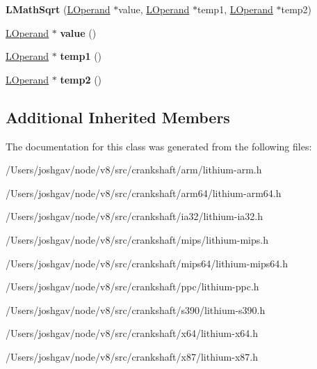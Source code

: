 \begin{DoxyCompactItemize}
\item 
{\bfseries L\+Math\+Sqrt} (\hyperlink{classv8_1_1internal_1_1_l_operand}{L\+Operand} $\ast$value, \hyperlink{classv8_1_1internal_1_1_l_operand}{L\+Operand} $\ast$temp1, \hyperlink{classv8_1_1internal_1_1_l_operand}{L\+Operand} $\ast$temp2)\hypertarget{classv8_1_1internal_1_1_l_math_sqrt_a0f3ccabf0c380c3c908a2fe569e251f5}{}\label{classv8_1_1internal_1_1_l_math_sqrt_a0f3ccabf0c380c3c908a2fe569e251f5}

\item 
\hyperlink{classv8_1_1internal_1_1_l_operand}{L\+Operand} $\ast$ {\bfseries value} ()\hypertarget{classv8_1_1internal_1_1_l_math_sqrt_a3a3d3a6f3e5469c0af488884adb214cd}{}\label{classv8_1_1internal_1_1_l_math_sqrt_a3a3d3a6f3e5469c0af488884adb214cd}

\item 
\hyperlink{classv8_1_1internal_1_1_l_operand}{L\+Operand} $\ast$ {\bfseries temp1} ()\hypertarget{classv8_1_1internal_1_1_l_math_sqrt_ae20938261c530c4f601c4f999b5c4a18}{}\label{classv8_1_1internal_1_1_l_math_sqrt_ae20938261c530c4f601c4f999b5c4a18}

\item 
\hyperlink{classv8_1_1internal_1_1_l_operand}{L\+Operand} $\ast$ {\bfseries temp2} ()\hypertarget{classv8_1_1internal_1_1_l_math_sqrt_a1a39abe987ab1d7a33d7d860f7a14c7b}{}\label{classv8_1_1internal_1_1_l_math_sqrt_a1a39abe987ab1d7a33d7d860f7a14c7b}

\end{DoxyCompactItemize}
\subsection*{Additional Inherited Members}


The documentation for this class was generated from the following files\+:\begin{DoxyCompactItemize}
\item 
/\+Users/joshgav/node/v8/src/crankshaft/arm/lithium-\/arm.\+h\item 
/\+Users/joshgav/node/v8/src/crankshaft/arm64/lithium-\/arm64.\+h\item 
/\+Users/joshgav/node/v8/src/crankshaft/ia32/lithium-\/ia32.\+h\item 
/\+Users/joshgav/node/v8/src/crankshaft/mips/lithium-\/mips.\+h\item 
/\+Users/joshgav/node/v8/src/crankshaft/mips64/lithium-\/mips64.\+h\item 
/\+Users/joshgav/node/v8/src/crankshaft/ppc/lithium-\/ppc.\+h\item 
/\+Users/joshgav/node/v8/src/crankshaft/s390/lithium-\/s390.\+h\item 
/\+Users/joshgav/node/v8/src/crankshaft/x64/lithium-\/x64.\+h\item 
/\+Users/joshgav/node/v8/src/crankshaft/x87/lithium-\/x87.\+h\end{DoxyCompactItemize}
